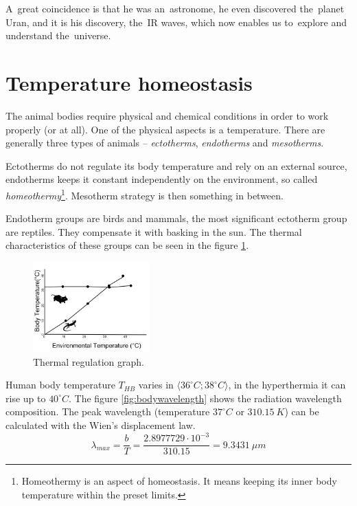 A~great coincidence is that he was an~astronome, he even discovered the~planet Uran, and it is his discovery,
the~IR waves, which now enables us to~explore and understand the~universe. \cite{NasaIrVideo}



\newpage
\section{Temperature homeostasis}
The animal bodies require physical and chemical conditions in order to work properly (or at all). One of
the physical aspects is a temperature. There are generally three types of animals -- {\it ectotherms},
{\it endotherms} and {\it mesotherms}.

Ectotherms do not regulate its body temperature and rely on an external source, endotherms keeps it
constant independently on the environment, so called {\it homeothermy}\footnote{Homeothermy is an aspect
of homeostasis. It means keeping its inner body temperature within the preset limits.}. Mesotherm
strategy is then something in between.

Endotherm groups are birds and mammals, the most significant ectotherm group are reptiles. They compensate
it with basking in the sun. The thermal characteristics of these groups can be seen in the figure \ref{fig:thermoregulatory}.

\begin{figure}[h!]
\begin{center}
\includegraphics[width=0.4\textwidth]{obrazky-figures/thermoregulatory.png}
\caption{Thermal regulation graph.\label{fig:thermoregulatory}}
\end{center}    
\end{figure}

Human body temperature $T_{HB}$ varies in $\langle 36^{\circ}C; 38^{\circ}C \rangle$, in the hyperthermia
it can rise up to $40^{\circ}C$. The figure \ref{fig:bodywavelength} shows the radiation wavelength composition.
The peak wavelength (temperature $37^{\circ}C$ or $310.15~K$) can be calculated with the Wien's displacement law.
$$\lambda_{max}=\frac{b}{T}=\frac{2.8977729 \cdot 10^{-3}}{310.15} = 9.3431~\mu m$$

